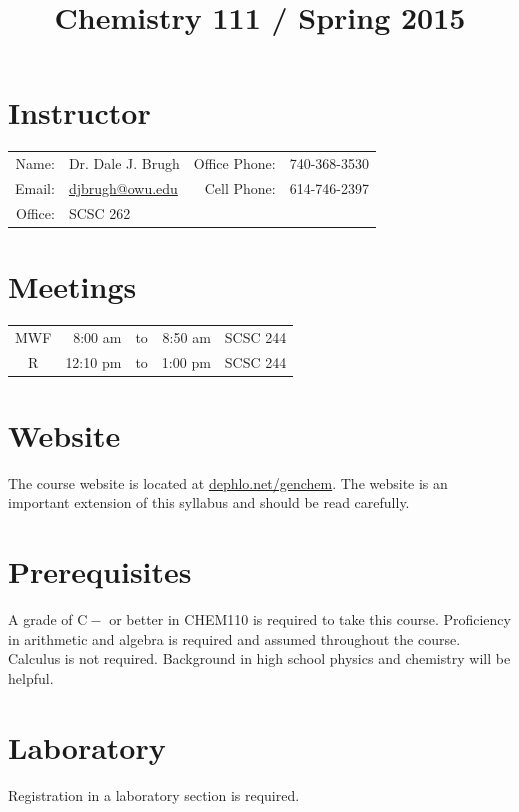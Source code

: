 \documentclass[letterpaper,oneside,onecolumn,11pt,article]{memoir}
\title{Chemistry 111 / Spring 2015}
\date{}
\author{}
\begin{document}
\maketitle
\thispagestyle{courseinformationtitle}
%
%
\section{Instructor}
\begin{tabular}{rl|rl}
Name: & Dr. Dale J. Brugh & Office Phone: & 740-368-3530 \\
Email: & \href{mailto:djbrugh@owu.edu}{djbrugh@owu.edu} & Cell Phone: & 614-746-2397 \\
Office: & SCSC 262 & &  \\
\end{tabular}
%
%
\section{Meetings}
\begin{tabular}{crcrl}
MWF & 8:00 am & to & 8:50 am & SCSC 244 \\
R & 12:10 pm & to & 1:00 pm & SCSC 244
\end{tabular}
%
%
\section{Website}
The course website is located at \href{http://dephlo.net/genchem}{dephlo.net/genchem}. The website is an important extension of this syllabus and should be read carefully. 
%
%
\section{Prerequisites}
A grade of $\mathrm{C}-$ or better in CHEM110 is required to take this course. Proficiency in arithmetic and algebra is required and assumed throughout the course. Calculus is not required. Background in high school physics and chemistry will be helpful. 
%
%
\section{Laboratory}
Registration in a laboratory section is required. 
%
%
\end{document}
